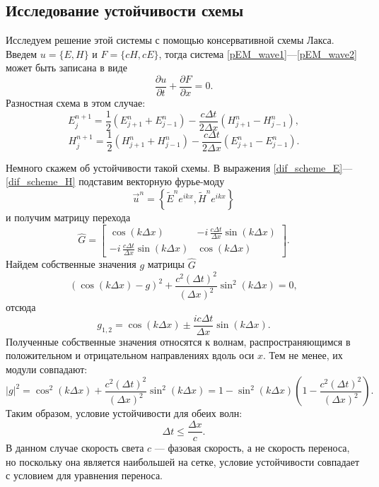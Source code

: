 \documentclass[12pt,a4paper]{article}
\begin{document}
	\subsection{Исследование устойчивости схемы}
	Исследуем решение этой системы с помощью консервативной схемы Лакса. Введем $u = \{E, H\}$ и $F = \{cH, cE\}$, тогда система \eqref{pEM_wave1}---\eqref{pEM_wave2} может быть записана в виде
	\begin{equation}\label{eq_wave}
		\frac{\partial u}{\partial t} + \frac{\partial F}{\partial x} = 0.
	\end{equation}
	Разностная схема в этом случае:
	\begin{equation}\label{dif_scheme_E}
		E_j^{n+1} = \frac{1}{2}\left(E_{j+1}^n + E_{j-1}^n\right) - \frac{c\Delta t}{2\Delta x}\left(H_{j+1}^n - H_{j-1}^n\right),
	\end{equation}
	\begin{equation}\label{dif_scheme_H}
		H_j^{n+1} = \frac{1}{2}\left(H_{j+1}^n + H_{j-1}^n\right) - \frac{c\Delta t}{2\Delta x}\left(E_{j+1}^n - E_{j-1}^n\right).
	\end{equation}
	
	Немного скажем об устойчивости такой схемы. В выражения \eqref{dif_scheme_E}---\eqref{dif_scheme_H} подставим векторную фурье-моду
	\begin{equation}
		\vec{u}^n = \left\{\widetilde{E}^n e^{ikx}, \widetilde{H}^n e^{ikx}\right\}
	\end{equation}
	и получим матрицу перехода
	\begin{equation}
		\hat{G} = 
		\begin{bmatrix}
			\cos{(k\Delta x)} & -i\,\frac{c\Delta t}{\Delta x}\sin{(k\Delta x)}\\
			-i\,\frac{c\Delta t}{\Delta x}\sin{(k\Delta x)} & \cos{(k\Delta x)}
		\end{bmatrix}.
	\end{equation}
	Найдем собственные значения $g$ матрицы $\hat{G}$
	\begin{equation}
		\left(\cos{(k\Delta x)} - g\right)^2 + \frac{c^2(\Delta t)^2}{(\Delta x)^2}\sin^2{(k\Delta x)} = 0,
	\end{equation}
	отсюда
	\begin{equation}
		g_{1,2} = \cos{(k\Delta x)} \pm \frac{ic\Delta t}{\Delta x}\sin{(k\Delta x)}.
	\end{equation}
	Полученные собственные значения относятся к волнам, распространяющимся в положительном и отрицательном направлениях вдоль оси $x$. Тем не менее, их модули совпадают:
	\begin{equation}
		|g|^2 = \cos^2{(k\Delta x)} + \frac{c^2(\Delta t)^2}{(\Delta x)^2}\sin^2{(k\Delta x)} = 1 - \sin^2{(k\Delta x)}\left(1 - \frac{c^2(\Delta t)^2}{(\Delta x)^2}\right).
	\end{equation}
	Таким образом, условие устойчивости для обеих волн:
	\begin{equation}
		\Delta t \leq \frac{\Delta x}{c}.
	\end{equation}
	В данном случае скорость света $c$ --- фазовая скорость, а не скорость переноса, но поскольку она является наибольшей на сетке, условие устойчивости совпадает с условием для уравнения переноса.
	
\end{document}
